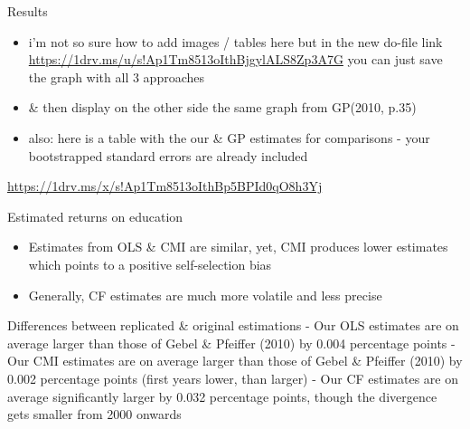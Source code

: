 \documentclass[10pt,ignorenonframetext,]{beamer}
\providecommand{\tightlist}{%
  \setlength{\itemsep}{0pt}\setlength{\parskip}{0pt}}
\begin{document}
\begin{frame}{Results}
\protect\hypertarget{results}{}

\begin{itemize}
\item
  i'm not so sure how to add images / tables here but in the new do-file
  link \url{https://1drv.ms/u/s!Ap1Tm8513oIthBjgylALS8Zp3A7G} you can
  just save the graph with all 3 approaches
\item
  \& then display on the other side the same graph from GP(2010, p.35)
\item
  also: here is a table with the our \& GP estimates for comparisons -
  your bootstrapped standard errors are already included
\end{itemize}

\url{https://1drv.ms/x/s!Ap1Tm8513oIthBp5BPId0qO8h3Yj}

\end{frame}

\begin{frame}{Estimated returns on education}
\protect\hypertarget{estimated-returns-on-education}{}

\begin{itemize}
\tightlist
\item
  Estimates from OLS \& CMI are similar, yet, CMI produces lower
  estimates which points to a positive self-selection bias
\item
  Generally, CF estimates are much more volatile and less precise
\end{itemize}

Differences between replicated \& original estimations - Our OLS
estimates are on average larger than those of Gebel \& Pfeiffer (2010)
by 0.004 percentage points - Our CMI estimates are on average larger
than those of Gebel \& Pfeiffer (2010) by 0.002 percentage points (first
years lower, than larger) - Our CF estimates are on average
significantly larger by 0.032 percentage points, though the divergence
gets smaller from 2000 onwards

\end{frame}
\end{document}
